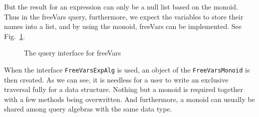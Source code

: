 But the result for an expression can only be a null list based on the monoid. Thus in the freeVars query, furthermore, we expect the variables to store their names into a list, and by using the monoid, freeVars can be implemented. See Fig.~\ref{freevars_with_monoid}.

\begin{figure}[tb]
\vspace{-.1in}
\caption{The query interface for freeVars}
\label{freevars_with_monoid}
\end{figure}

When the interface \lstinline{FreeVarsExpAlg} is used, an object of the \lstinline{FreeVarsMonoid} is then created. As we can see, it is needless for a user to write an exclusive traversal fully for a data structure. Nothing but a monoid is required together with a few methods being overwritten. And furthermore, a monoid can usually be shared among query algebras with the same data type.

